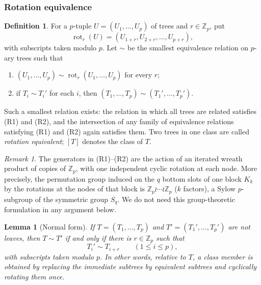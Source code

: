 \documentclass[11pt]{article}
\newtheorem{lemma}[theorem]{Lemma}
\theoremstyle{definition}
\newtheorem{definition}[theorem]{Definition}
\theoremstyle{remark}
\newtheorem{remark}[theorem]{Remark}
\numberwithin{equation}{section}
\numberwithin{figure}{section}
\newcommand{\Z}{\mathbb Z}
\newcommand{\rot}{\operatorname{rot}}
\begin{document}
\subsubsection{Rotation equivalence}
\begin{definition}
For a $p$-tuple $U=(U_1,\ldots,U_p)$ of trees and $r\in\Z_p$, put
\[
 \rot_r(U)=(U_{1+r},U_{2+r},\ldots,U_{p+r}),
\]
with subscripts taken modulo $p$.  Let $\sim$ be the smallest equivalence relation on $p$-ary trees such that
\begin{enumerate}
\item[\textup{(R1)}] $(U_1,\ldots,U_p)\sim\rot_r(U_1,\ldots,U_p)$ for every $r$;
\item[\textup{(R2)}] if $T_i\sim T_i'$ for each $i$, then $(T_1,\ldots,T_p)\sim(T_1',\ldots,T_p')$.
\end{enumerate}
Such a smallest relation exists: the relation in which all trees are related satisfies (R1) and (R2), and the intersection of any family of equivalence relations satisfying (R1) and (R2) again satisfies them.  Two trees in one class are called \emph{rotation equivalent}; $[T]$ denotes the class of $T$.
\end{definition}
\begin{remark}
The generators in (R1)--(R2) are the action of an iterated wreath product of copies of $\Z_p$, with one independent cyclic rotation at each node.  More precisely, the permutation group induced on the $q$ bottom slots of one block $K_k$ by the rotations at the nodes of that block is $\Z_p\wr\cdots\wr\Z_p$ ($k$ factors), a Sylow $p$-subgroup of the symmetric group $S_q$.  We do not need this group-theoretic formulation in any argument below.
\end{remark}
\begin{lemma}[Normal form]\label{main:lem:normal-form}
If $T=(T_1,\ldots,T_p)$ and $T'=(T_1',\ldots,T_p')$ are not leaves, then $T\sim T'$ if and only if there is $r\in\Z_p$ such that
\[
 T_i'\sim T_{i+r}\qquad(1\le i\le p),
\]
with subscripts taken modulo $p$.  In other words, relative to $T$, a class member is obtained by replacing the immediate subtrees by equivalent subtrees and cyclically rotating them once.
\end{lemma}
\end{document}
